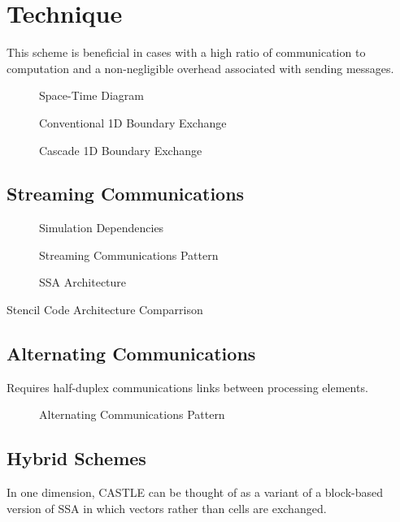 \section{Technique}


This scheme is beneficial in cases with a high ratio of communication to computation and a non-negligible overhead associated with sending messages.


\begin{figure}
  \centering
  
  \caption{Space-Time Diagram}
  \label{fig:lightcone}
\end{figure}


\begin{figure}
  \centering
  
  \caption{Conventional 1D Boundary Exchange}
  \label{fig:exch1d}
\end{figure}

\begin{figure}
  \centering
  
  \caption{Cascade 1D Boundary Exchange}
  \label{fig:casc1d}
\end{figure}

\subsection{Streaming Communications}
\begin{figure}
  \centering
  
  \caption{Simulation Dependencies}
  \label{fig:simcone}
\end{figure}

\begin{figure}
  \centering
  
  \caption{Streaming Communications Pattern}
  \label{fig:streamingcomms}
\end{figure}

\begin{figure}
  \centering
  
  \caption{SSA Architecture}
  \label{fig:ssa_concept}
\end{figure}


\begin{table}
  \scriptsize
  \centering
  \caption{Stencil Code Architecture Comparrison}
  \label{tab:comparrison}
  
\end{table}

\subsection{Alternating Communications}

Requires half-duplex communications links between processing elements.
\begin{figure}
  \centering
  
  \caption{Alternating Communications Pattern}
  \label{fig:alternatingcomms}
\end{figure}


\subsection{Hybrid Schemes}
In one dimension, CASTLE can be thought of as a variant of a block-based version of SSA in which vectors rather than cells are exchanged.
